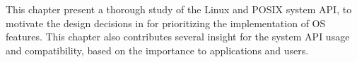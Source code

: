 This chapter present a thorough study of the Linux and POSIX system API,
to motivate the design decisions in \graphene{} for prioritizing the implementation of OS features.
This chapter also contributes several insight
for the system API usage and compatibility, based on the importance to applications and users. 
